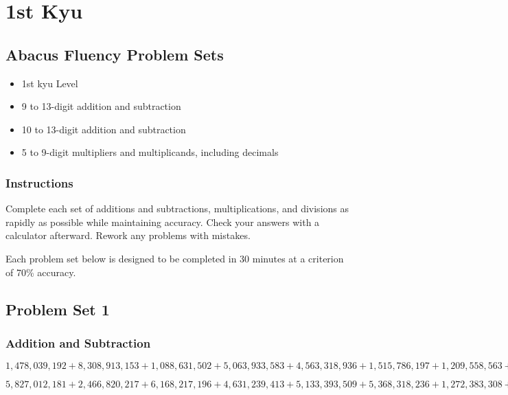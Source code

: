 \hypertarget{st-kyu}{%
\section{1st Kyu}\label{st-kyu}}

\hypertarget{abacus-fluency-problem-sets-7}{%
\subsection{Abacus Fluency Problem
Sets}\label{abacus-fluency-problem-sets-7}}

\begin{itemize}
\item
  1st kyu Level
\item
  9 to 13-digit addition and subtraction
\item
  10 to 13-digit addition and subtraction
\item
  5 to 9-digit multipliers and multiplicands, including decimals
\end{itemize}

\hypertarget{instructions-7}{%
\subsubsection{Instructions}\label{instructions-7}}

Complete each set of additions and subtractions, multiplications, and
divisions as rapidly as possible while maintaining accuracy. Check your
answers with a calculator afterward. Rework any problems with mistakes.

Each problem set below is designed to be completed in 30 minutes at a
criterion of 70\% accuracy.

\hypertarget{problem-set-1-5}{%
\subsection{Problem Set 1}\label{problem-set-1-5}}

\hypertarget{addition-and-subtraction-381}{%
\subsubsection{Addition and
Subtraction}\label{addition-and-subtraction-381}}

\(1,478,039,192+8,308,913,153+1,088,631,502+5,063,933,583+4,563,318,936+1,515,786,197+1,209,558,563+1,843,479,303+1,360,033,601+6,275,780,009\)

\(5,827,012,181+2,466,820,217+6,168,217,196+4,631,239,413+5,133,393,509+5,368,318,236+1,272,383,308+3,734,978,562+7,289,524,700+5,689,092,535\)

